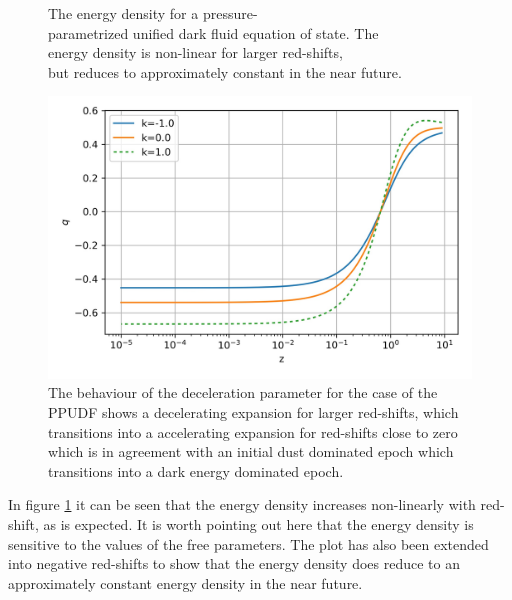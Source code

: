 \documentclass[a0,portrait]{a0poster}
\renewcommand{\baselinestretch}{0.85}
\begin{document}
\begin{multicols}{2}
\begin{minipage}{.24\textwidth}
\begin{figure}[H]
\caption{The energy density for a pressure-\\parametrized unified dark fluid equation of state. The\\ energy density is non-linear for larger red-shifts, \\but reduces to approximately constant in the near future.}
\label{fig:UDFRho}
\end{figure}
\end{minipage}%
\begin{minipage}{.24\textwidth}
\vspace{20pt}
\begin{figure}[H]
\centering
\includegraphics[scale=0.9]{Figures/UDF_q.jpg}
\caption{The behaviour of the deceleration parameter for the case of the PPUDF shows a decelerating expansion for larger red-shifts, which transitions into a accelerating expansion for red-shifts close to zero which is in agreement with an initial dust dominated epoch which transitions into a dark energy dominated epoch. }
\renewcommand{\baselinestretch}{0.85}
\label{fig:UDFq}
\end{figure}
\end{minipage}
In figure \ref{fig:UDFRho} it can be seen that the energy density increases non-linearly with red-shift, as is expected. It is worth pointing out here that the energy density is sensitive to the values of the free parameters. The plot has also been extended into negative red-shifts to show that the energy density does reduce to an approximately constant energy density in the near future.

\end{multicols}
\end{document}

